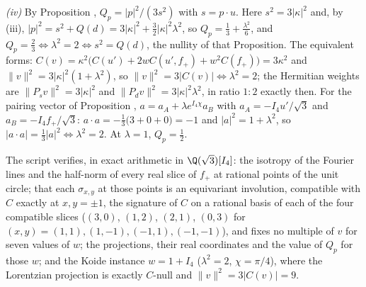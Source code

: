 \emph{(iv)} By Proposition , $Q_{p} = |p|^{2}/(3s^{2})$ with $s = p \cdot u$. Here $s^{2} = 3|\kappa|^{2}$ and, by (iii), $|p|^{2} = s^{2} + Q(d) = 3|\kappa|^{2} + \tfrac32|\kappa|^{2}\lambda^{2}$, so $Q_{p} = \tfrac13 + \tfrac{\lambda^{2}}{6}$, and $Q_{p} = \tfrac23 \iff \lambda^{2} = 2 \iff s^{2} = Q(d)$, the nullity of that Proposition. The equivalent forms: $C(v) = \kappa^{2}\bigl(C(u') + 2wC(u', f_{+}) + w^{2}C(f_{+})\bigr) = 3\kappa^{2}$ and $\|v\|^{2} = 3|\kappa|^{2}(1 + \lambda^{2})$, so $\|v\|^{2} = 3|C(v)| \iff \lambda^{2} = 2$; the Hermitian weights are $\|P_{s}v\|^{2} = 3|\kappa|^{2}$ and $\|P_{d}v\|^{2} = 3|\kappa|^{2}\lambda^{2}$, in ratio $1:2$ exactly then. For the pairing vector of Proposition , $a = a_{A} + \lambda e^{I_4\chi}a_{B}$ with $a_{A} = -I_4 u'/\sqrt3$ and $a_{B} = -I_4 f_{+}/\sqrt3$: $a \cdot a = -\tfrac13\bigl(3 + 0 + 0\bigr) = -1$ and $|a|^{2} = 1 + \lambda^{2}$, so $|a \cdot a| = \tfrac13|a|^{2} \iff \lambda^{2} = 2$. At $\lambda = 1$, $Q_{p} = \tfrac12$.

The script verifies, in exact arithmetic in $\Q(\sqrt3)[I_4]$: the isotropy of the Fourier lines and the half-norm of every real slice of $f_{+}$ at rational points of the unit circle; that each $\sigma_{x,y}$ at those points is an equivariant involution, compatible with $C$ exactly at $x, y = \pm1$, the signature of $C$ on a rational basis of each of the four compatible slices ($(3,0)$, $(1,2)$, $(2,1)$, $(0,3)$ for $(x,y) = (1,1), (1,-1), (-1,1), (-1,-1)$), and fixes no multiple of $v$ for seven values of $w$; the projections, their real coordinates and the value of $Q_{p}$ for those $w$; and the Koide instance $w = 1 + I_4$ ($\lambda^{2} = 2$, $\chi = \pi/4$), where the Lorentzian projection is exactly $C$-null and $\|v\|^{2} = 3|C(v)| = 9$.
